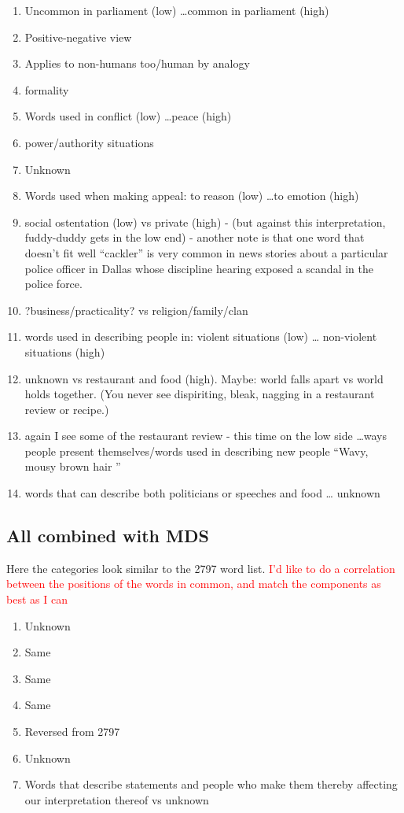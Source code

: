 \documentclass[10pt,letterpaper]{book}
\newcommand{\todo}[1]{\textcolor{red}{#1}}
\begin{document}
\begin{enumerate}
 \item Uncommon in parliament (low) \ldots common in parliament (high)
 \item Positive-negative view
 \item Applies to non-humans too/human by analogy
 \item formality
 \item Words used in conflict (low) \ldots peace (high)
 \item power/authority situations
 \item Unknown
 \item Words used when making appeal: to reason (low) \ldots to emotion (high)
 \item social ostentation (low) vs private (high) - (but against this 
       interpretation, fuddy-duddy gets in the low end) - another note is that 
       one word that doesn't fit well ``cackler'' is very common in news 
       stories about a particular police officer in Dallas whose discipline 
       hearing exposed a scandal in the police force.
 \item ?business/practicality? vs religion/family/clan
 \item words used in describing people in: violent situations (low) \ldots 
       non-violent situations (high)
 \item unknown vs restaurant and food (high). Maybe: world falls apart vs world 
       holds together. (You never see dispiriting, bleak, nagging in a 
       restaurant review or recipe.)
 \item again I see some of the restaurant review - this time on the low side 
       \ldots ways people present themselves/words used in describing new 
       people ``Wavy, mousy brown hair ''
 \item words that can describe both politicians or speeches and food \ldots 
       unknown
\end{enumerate}

\subsection{All combined with MDS}

Here the categories look similar to the 2797 word list. \todo{I'd like to do a 
correlation between the positions of the words in common, and match the 
components as best as I can}

\begin{enumerate}
 \item Unknown
 \item Same
 \item Same
 \item Same
 \item Reversed from 2797
 \item Unknown
 \item Words that describe statements and people who make them thereby 
       affecting our interpretation thereof vs unknown
\end{enumerate}
\end{document}
